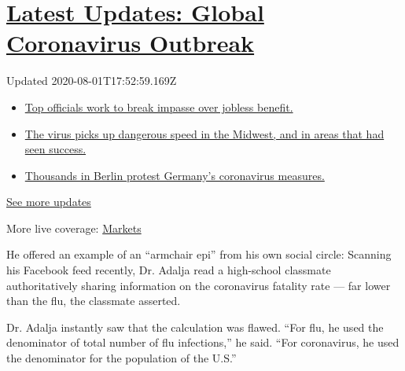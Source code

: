 \hypertarget{latest-updates-global-coronavirus-outbreak}{%
\section{\texorpdfstring{\href{https://www.nytimes.com/2020/08/01/world/coronavirus-covid-19.html?action=click\&pgtype=Article\&state=default\&region=MAIN_CONTENT_1\&context=storylines_live_updates}{Latest
Updates: Global Coronavirus
Outbreak}}{Latest Updates: Global Coronavirus Outbreak}}\label{latest-updates-global-coronavirus-outbreak}}

Updated 2020-08-01T17:52:59.169Z

\begin{itemize}
\tightlist
\item
  \href{https://www.nytimes.com/2020/08/01/world/coronavirus-covid-19.html?action=click\&pgtype=Article\&state=default\&region=MAIN_CONTENT_1\&context=storylines_live_updates\#link-3ac56579}{Top
  officials work to break impasse over jobless benefit.}
\item
  \href{https://www.nytimes.com/2020/08/01/world/coronavirus-covid-19.html?action=click\&pgtype=Article\&state=default\&region=MAIN_CONTENT_1\&context=storylines_live_updates\#link-8796723}{The
  virus picks up dangerous speed in the Midwest, and in areas that had
  seen success.}
\item
  \href{https://www.nytimes.com/2020/08/01/world/coronavirus-covid-19.html?action=click\&pgtype=Article\&state=default\&region=MAIN_CONTENT_1\&context=storylines_live_updates\#link-25930521}{Thousands
  in Berlin protest Germany's coronavirus measures.}
\end{itemize}

\href{https://www.nytimes.com/2020/08/01/world/coronavirus-covid-19.html?action=click\&pgtype=Article\&state=default\&region=MAIN_CONTENT_1\&context=storylines_live_updates}{See
more updates}

More live coverage:
\href{https://www.nytimes.com/live/2020/07/31/business/stock-market-today-coronavirus?action=click\&pgtype=Article\&state=default\&region=MAIN_CONTENT_1\&context=storylines_live_updates}{Markets}

He offered an example of an ``armchair epi'' from his own social circle:
Scanning his Facebook feed recently, Dr. Adalja read a high-school
classmate authoritatively sharing information on the coronavirus
fatality rate --- far lower than the flu, the classmate asserted.

Dr. Adalja instantly saw that the calculation was flawed. ``For flu, he
used the denominator of total number of flu infections,'' he said. ``For
coronavirus, he used the denominator for the population of the U.S.''

